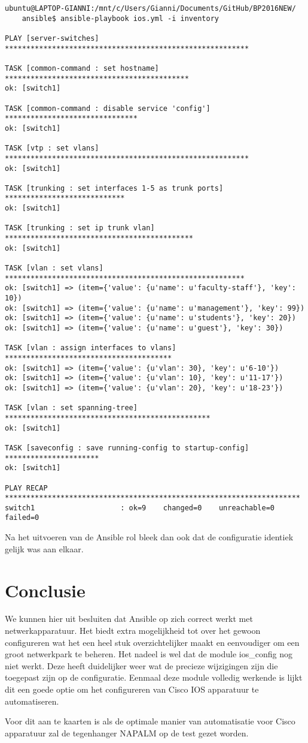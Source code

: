 \begin{verbatim}
ubuntu@LAPTOP-GIANNI:/mnt/c/Users/Gianni/Documents/GitHub/BP2016NEW/
    ansible$ ansible-playbook ios.yml -i inventory

PLAY [server-switches] *********************************************************

TASK [common-command : set hostname] *******************************************
ok: [switch1]

TASK [common-command : disable service 'config'] *******************************
ok: [switch1]

TASK [vtp : set vlans] *********************************************************
ok: [switch1]

TASK [trunking : set interfaces 1-5 as trunk ports] ****************************
ok: [switch1]

TASK [trunking : set ip trunk vlan] ********************************************
ok: [switch1]

TASK [vlan : set vlans] ********************************************************
ok: [switch1] => (item={'value': {u'name': u'faculty-staff'}, 'key': 10})
ok: [switch1] => (item={'value': {u'name': u'management'}, 'key': 99})
ok: [switch1] => (item={'value': {u'name': u'students'}, 'key': 20})
ok: [switch1] => (item={'value': {u'name': u'guest'}, 'key': 30})

TASK [vlan : assign interfaces to vlans] ***************************************
ok: [switch1] => (item={'value': {u'vlan': 30}, 'key': u'6-10'})
ok: [switch1] => (item={'value': {u'vlan': 10}, 'key': u'11-17'})
ok: [switch1] => (item={'value': {u'vlan': 20}, 'key': u'18-23'})

TASK [vlan : set spanning-tree] ************************************************
ok: [switch1]

TASK [saveconfig : save running-config to startup-config] **********************
ok: [switch1]

PLAY RECAP *********************************************************************
switch1                    : ok=9    changed=0    unreachable=0    failed=0
\end{verbatim}

Na het uitvoeren van de Ansible rol bleek dan ook dat de configuratie identiek gelijk was aan elkaar. 

\section{Conclusie}
\label{ch:ansibleconclusion}
We kunnen hier uit besluiten dat Ansible op zich correct werkt met netwerkapparatuur. Het biedt extra mogelijkheid tot over het gewoon configureren wat het een heel stuk overzichtelijker maakt en eenvoudiger om een groot netwerkpark te beheren. Het nadeel is wel dat de module ios\_config nog niet werkt. Deze heeft duidelijker weer wat de precieze wijzigingen zijn die toegepast zijn op de configuratie. Eenmaal deze module volledig werkende is lijkt dit een goede optie om het configureren van Cisco IOS apparatuur te automatiseren.

Voor dit aan te kaarten is als de optimale manier van automatisatie voor Cisco apparatuur zal de tegenhanger NAPALM op de test gezet worden.